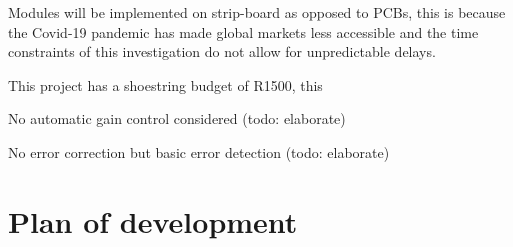 Modules will be implemented on strip-board as opposed to PCBs, this is because the Covid-19 pandemic has made global markets less accessible and the time constraints of this investigation do not allow for unpredictable delays.



This project has a shoestring budget of R1500, this 

No automatic gain control considered (todo: elaborate)

No error correction but basic error detection (todo: elaborate)





\section{Plan of development}

